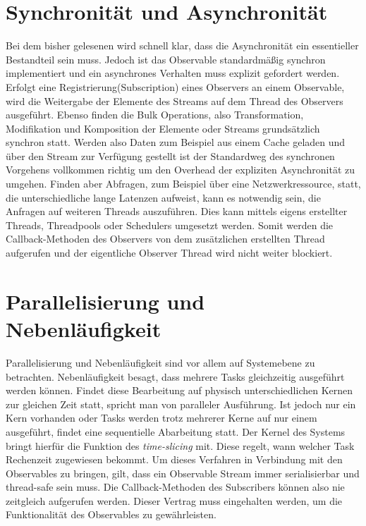 \section{Synchronität und Asynchronität}
Bei dem bisher gelesenen wird schnell klar, dass die Asynchronität ein essentieller Bestandteil sein muss. Jedoch ist das Observable standardmäßig synchron implementiert und ein asynchrones Verhalten muss explizit gefordert werden. Erfolgt eine Registrierung(Subscription) eines Observers an einem Observable, wird die Weitergabe der Elemente des Streams auf dem Thread des Observers ausgeführt. Ebenso finden die Bulk Operations, also Transformation, Modifikation und Komposition der Elemente oder Streams grundsätzlich synchron statt. Werden also Daten zum Beispiel aus einem Cache geladen und über den Stream zur Verfügung gestellt ist der Standardweg des synchronen Vorgehens vollkommen richtig um den Overhead der expliziten Asynchronität zu umgehen. Finden aber Abfragen, zum Beispiel über eine Netzwerkressource, statt, die unterschiedliche lange Latenzen aufweist, kann es notwendig sein, die Anfragen auf weiteren Threads auszuführen. Dies kann mittels eigens erstellter Threads, Threadpools oder Schedulers umgesetzt werden. Somit werden die Callback-Methoden des Observers von dem zusätzlichen erstellten Thread aufgerufen und der eigentliche Observer Thread wird nicht weiter blockiert.
\section{Parallelisierung und Nebenläufigkeit}
Parallelisierung und Nebenläufigkeit sind vor allem auf Systemebene zu betrachten. Nebenläufigkeit besagt, dass mehrere Tasks gleichzeitig ausgeführt werden können. Findet diese Bearbeitung auf physisch unterschiedlichen Kernen zur gleichen Zeit statt, spricht man von paralleler Ausführung. Ist jedoch nur ein Kern vorhanden oder Tasks werden trotz mehrerer Kerne auf nur einem ausgeführt, findet eine sequentielle Abarbeitung statt. Der Kernel des Systems bringt hierfür die Funktion des \textit{time-slicing} mit. Diese regelt, wann welcher Task Rechenzeit zugewiesen bekommt. Um dieses Verfahren in Verbindung mit den Observables zu bringen, gilt, dass ein Observable Stream immer serialisierbar und thread-safe sein muss. Die Callback-Methoden des Subscribers können also nie zeitgleich aufgerufen werden. Dieser Vertrag muss eingehalten werden, um die Funktionalität des Observables zu gewährleisten.
